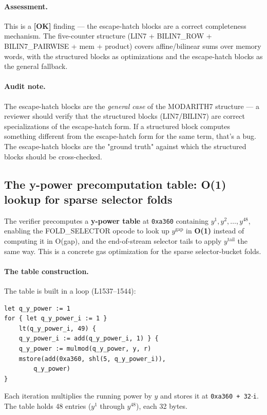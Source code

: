 \paragraph{Assessment.} This is a
\textcolor{tracegreen}{\textbf{[OK]}} finding --- the
escape-hatch blocks are a correct completeness mechanism. The
five-counter structure (LIN7 + BILIN7\_ROW + BILIN7\_PAIRWISE +
mem + product) covers affine/bilinear sums over memory words,
with the structured blocks as optimizations and the escape-hatch
blocks as the general fallback.

\paragraph{Audit note.} The escape-hatch blocks are the
\emph{general case} of the MODARITH7 structure --- a reviewer
should verify that the structured blocks (LIN7/BILIN7) are
correct specializations of the escape-hatch form. If a structured
block computes something different from the escape-hatch form for
the same term, that's a bug. The escape-hatch blocks are the
"ground truth" against which the structured blocks should be
cross-checked.

\subsection{The y-power precomputation table: O(1) lookup for sparse selector folds}
\label{sec:ypowertable}

The verifier precomputes a \textbf{y-power table} at
\texttt{0xa360} containing $y^1, y^2, \dots, y^{48}$, enabling
the FOLD\_SELECTOR opcode to look up $y^{\text{gap}}$ in
\textbf{O(1)} instead of computing it in O(gap), and the
end-of-stream selector tails to apply $y^{\text{tail}}$ the same
way. This is a concrete gas optimization for the sparse
selector-bucket folds.

\paragraph{The table construction.} The table is built in a loop
(L1537--1544):
\begin{lstlisting}[style=yul]
let q_y_power := 1
for { let q_y_power_i := 1 }
    lt(q_y_power_i, 49) {
    q_y_power_i := add(q_y_power_i, 1) } {
    q_y_power := mulmod(q_y_power, y, r)
    mstore(add(0xa360, shl(5, q_y_power_i)),
        q_y_power)
}
\end{lstlisting}
Each iteration multiplies the running power by $y$ and stores it
at \texttt{0xa360 + 32$\cdot$i}. The table holds 48 entries
($y^1$ through $y^{48}$), each 32 bytes.

